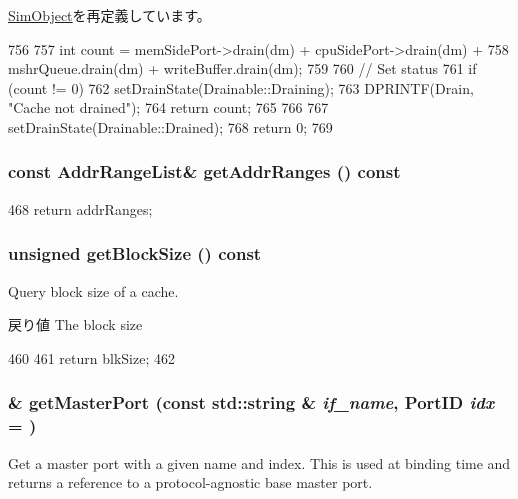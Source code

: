 \hyperlink{classSimObject_a6bf479c521c7c3eb473822d953275b26}{SimObject}を再定義しています。


\begin{DoxyCode}
756 {
757     int count = memSidePort->drain(dm) + cpuSidePort->drain(dm) +
758         mshrQueue.drain(dm) + writeBuffer.drain(dm);
759 
760     // Set status
761     if (count != 0) {
762         setDrainState(Drainable::Draining);
763         DPRINTF(Drain, "Cache not drained\n");
764         return count;
765     }
766 
767     setDrainState(Drainable::Drained);
768     return 0;
769 }
\end{DoxyCode}
\hypertarget{classBaseCache_a030a5d76880e3d3187c9f46971525d09}{
\subsubsection[{getAddrRanges}]{\setlength{\rightskip}{0pt plus 5cm}const {\bf AddrRangeList}\& getAddrRanges () const}}
\label{classBaseCache_a030a5d76880e3d3187c9f46971525d09}



\begin{DoxyCode}
468 { return addrRanges; }
\end{DoxyCode}
\hypertarget{classBaseCache_a38301abe4b3689f8ac7de5c13a046234}{
\subsubsection[{getBlockSize}]{\setlength{\rightskip}{0pt plus 5cm}unsigned getBlockSize () const}}
\label{classBaseCache_a38301abe4b3689f8ac7de5c13a046234}
Query block size of a cache. \begin{DoxyReturn}{戻り値}
The block size 
\end{DoxyReturn}



\begin{DoxyCode}
460     {
461         return blkSize;
462     }
\end{DoxyCode}
\hypertarget{classBaseCache_adc4e675e51defbdd1e354dac729d0703}{
\subsubsection[{getMasterPort}]{ \& getMasterPort (const std::string \& {\em if\_\-name}, \/  {\bf PortID} {\em idx} = {})}}
\label{classBaseCache_adc4e675e51defbdd1e354dac729d0703}
Get a master port with a given name and index. This is used at binding time and returns a reference to a protocol-\/agnostic base master port.


